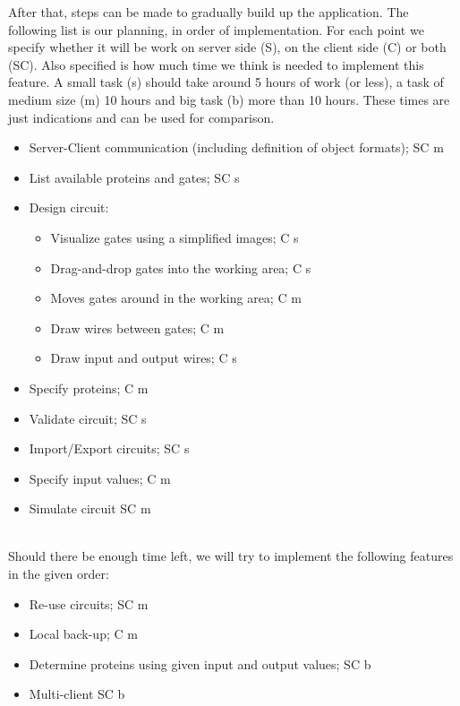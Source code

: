 \documentclass[a4paper]{article}
\begin{document}
After that, steps can be made to gradually build up the application. The following list is our planning, in order of implementation. For each point we specify whether it will be work on server side (S), on the client side (C) or both (SC). Also specified is how much time we think is needed to implement this feature. A small task (s) should take around 5 hours of work (or less), a task of medium size (m) 10 hours and big task (b) more than 10 hours. These times are just indications and can be used for comparison.
\begin{itemize}
\item Server-Client communication (including definition of object formats);	\tabto{13.8cm} SC \tabto{14.6cm} m
\item List available proteins and gates; 									\tabto{13.8cm} SC \tabto{14.6cm} s
\item Design circuit:													%
	\begin{itemize}
	\item Visualize gates using a simplified images;						\tabto{13cm}  C \tabto{13.8cm} s
	\item Drag-and-drop gates into the working area;						\tabto{13cm}  C \tabto{13.8cm} s
	\item Moves gates around in the working area;							\tabto{13cm}  C \tabto{13.8cm} m
	\item Draw wires between gates;											\tabto{13cm}  C \tabto{13.8cm} m
	\item Draw input and output wires;										\tabto{13cm}  C \tabto{13.8cm} s
	\end{itemize}
\item Specify proteins;														\tabto{13.8cm}  C \tabto{14.6cm} m
\item Validate circuit;														\tabto{13.8cm} SC \tabto{14.6cm} s
\item Import/Export circuits;												\tabto{13.8cm} SC \tabto{14.6cm} s
\item Specify input values;													\tabto{13.8cm}  C \tabto{14.6cm} m
\item Simulate circuit														\tabto{13.8cm} SC \tabto{14.6cm} m
\end{itemize}~\\

Should there be enough time left, we will try to implement the following features in the given order:
\begin{itemize}
\item Re-use circuits;											\tabto{13.8cm} SC \tabto{14.6cm} m
\item Local back-up;											\tabto{13.8cm}  C \tabto{14.6cm} m
\item Determine proteins using given input and output values;	\tabto{13.8cm} SC \tabto{14.6cm} b
\item Multi-client												\tabto{13.8cm} SC \tabto{14.6cm} b
\end{itemize}
\end{document}
